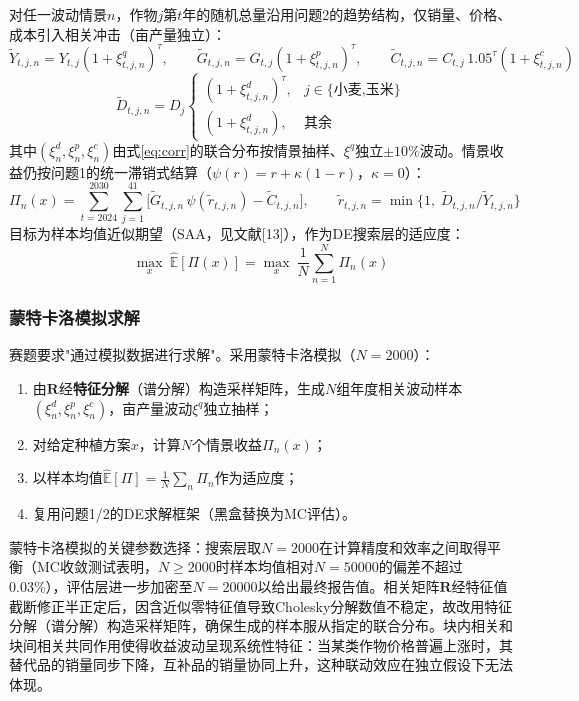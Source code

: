 \documentclass[12pt,a4paper]{article}
\begin{document}
对任一波动情景$n$，作物$j$第$t$年的随机总量沿用问题2的趋势结构，仅销量、价格、成本引入相关冲击（亩产量独立）：
\begin{equation}
\tilde Y_{t,j,n}=Y_{t,j}(1+\xi^q_{t,j,n})^{\tau},\qquad
\tilde G_{t,j,n}=G_{t,j}(1+\xi^p_{t,j,n})^{\tau},\qquad
\tilde C_{t,j,n}=C_{t,j}\,1.05^{\tau}(1+\xi^c_{t,j,n})
\label{eq:p3_scenario}
\end{equation}
\begin{equation}
\tilde D_{t,j,n}=D_j\begin{cases}
(1+\xi^d_{t,j,n})^{\tau},& j\in\{\text{小麦,玉米}\}\\
(1+\xi^d_{t,j,n}),& \text{其余}
\end{cases}
\label{eq:p3_demand}
\end{equation}
其中$(\xi^d_n,\xi^p_n,\xi^c_n)$由式\eqref{eq:corr}的联合分布按情景抽样、$\xi^q$独立$\pm10\%$波动。情景收益仍按问题1的统一滞销式结算（$\psi(r)=r+\kappa(1-r)$，$\kappa=0$）：
\begin{equation}
\Pi_n(x)=\sum_{t=2024}^{2030}\sum_{j=1}^{41}\Big[\tilde G_{t,j,n}\,\psi(\tilde r_{t,j,n})-\tilde C_{t,j,n}\Big],\qquad
\tilde r_{t,j,n}=\min\Big\{1,\;\tilde D_{t,j,n}/\tilde Y_{t,j,n}\Big\}
\label{eq:pi_n}
\end{equation}
目标为样本均值近似期望（SAA，见文献[13]），作为DE搜索层的适应度：
\begin{equation}
\max_x\ \hat{\mathbb{E}}[\Pi(x)]=\max_x\ \frac{1}{N}\sum_{n=1}^{N}\Pi_n(x)
\label{eq:saap3}
\end{equation}

\subsubsection{蒙特卡洛模拟求解}

赛题要求"通过模拟数据进行求解"。采用蒙特卡洛模拟（$N=2000$）：

\begin{enumerate}
  \item 由$\mathbf{R}$经\textbf{特征分解}（谱分解）构造采样矩阵，生成$N$组年度相关波动样本$(\xi^d_n,\xi^p_n,\xi^c_n)$，亩产量波动$\xi^q$独立抽样；
  \item 对给定种植方案$x$，计算$N$个情景收益$\Pi_n(x)$；
  \item 以样本均值$\hat{\mathbb{E}}[\Pi]=\frac{1}{N}\sum_n\Pi_n$作为适应度；
  \item 复用问题1/2的DE求解框架（黑盒替换为MC评估）。
\end{enumerate}

蒙特卡洛模拟的关键参数选择：搜索层取$N=2000$在计算精度和效率之间取得平衡（MC收敛测试表明，$N\ge2000$时样本均值相对$N=50000$的偏差不超过0.03\%），评估层进一步加密至$N=20000$以给出最终报告值。相关矩阵$\mathbf{R}$经特征值截断修正半正定后，因含近似零特征值导致Cholesky分解数值不稳定，故改用特征分解（谱分解）构造采样矩阵，确保生成的样本服从指定的联合分布。块内相关和块间相关共同作用使得收益波动呈现系统性特征：当某类作物价格普遍上涨时，其替代品的销量同步下降，互补品的销量协同上升，这种联动效应在独立假设下无法体现。
\end{document}
